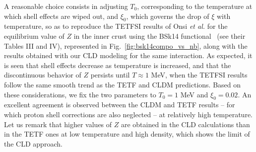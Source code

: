 A reasonable choice consists in adjusting $T_0$, corresponding to the 
temperature at which shell effects are wiped out, and $\xi_0$, which governs
the drop of $\xi$ with temperature, so as to reproduce the TETFSI results of 
Onsi \textit{et al.} for the equilibrium value of $Z$ in the inner crust using 
the BSk14 functional~\cite{Onsi2008} (see their Tables III and IV), 
represented in Fig.~\ref{fig:bsk14compo_vs_nb}, along with the results obtained 
with our CLD modeling for the same interaction.
As expected, it is seen that shell effects decrease as temperature is
increased, and that the discontinuous behavior of $Z$ persists until $T\approx
1$ MeV, when the TETFSI results follow the same smooth trend as the TETF and 
CLDM predictions.
Based on these considerations, we fix the two parameters to $T_0 = 1$ MeV and 
$\xi_0 = 0.02$.
An excellent agreement is observed between the CLDM and
TETF results -- for which proton shell corrections are also neglected -- at 
relatively high temperature. 
Let us remark that higher values of $Z$ are obtained in the 
CLD calculations than in the TETF ones at low temperature and high density,
which shows the limit of the CLD approach. 

